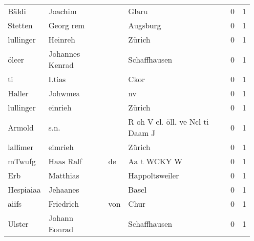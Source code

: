 \documentclass[10pt,a4paper,landscape]{article}
\begin{document}
\begin{longtable}{llllrr}
                    Bäldi &                            Joachim &             &                                       Glaru &          0 &         1 \\
                  Stetten &                          Georg rem &             &                                    Augsburg &          0 &         1 \\
                lullinger &                            Heinreh &             &                                      Zürich &          0 &         1 \\
                    öleer &                    Johannes Kenrad &             &                                Schaffhausen &          0 &         1 \\
                       ti &                             I.tias &             &                                        Ckor &          0 &         1 \\
                   Haller &                            Johwmea &             &                                          nv &          0 &         1 \\
                lullinger &                            einrieh &             &                                      Zürich &          0 &         1 \\
                   Armold &                               s.n. &             &            R oh V el. öll. ve Ncl ti Daam J &          0 &         1 \\
                 lallimer &                            eimrieh &             &                                      Zürich &          0 &         1 \\
                   mTwufg &                          Haas Ralf &          de &                                 Aa t WCKY W &          0 &         1 \\
                      Erb &                           Matthias &             &                              Happoltsweiler &          0 &         1 \\
                Hespiaiaa &                           Jehaanes &             &                                       Basel &          0 &         1 \\
                    aiifs &                          Friedrich &         von &                                        Chur &          0 &         1 \\
                   Ulster &                      Johann Eonrad &             &                                Schaffhausen &          0 &         1 \\

\end{longtable}
\end{document}
